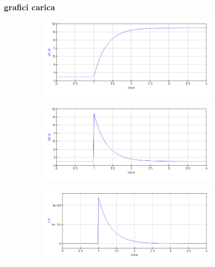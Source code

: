 \documentclass{article}
\begin{document}
\subsubsection*{grafici carica}
\begin{figure}[h!]
  \centering
  \begin{subfigure}[b]{0.3\linewidth}
    \includegraphics[width=\linewidth]{data/carica-VC.png}
  \end{subfigure}
  \begin{subfigure}[b]{0.3\linewidth}
    \includegraphics[width=\linewidth]{data/carica-VR.png}
  \end{subfigure}
  \begin{subfigure}[b]{0.3\linewidth}
    \includegraphics[width=\linewidth]{data/carica-IT.png}
  \end{subfigure}
\end{figure}
\end{document}
